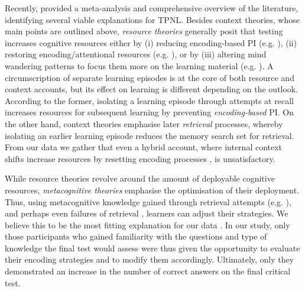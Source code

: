 \documentclass[../main.tex]{subfiles}
\begin{document}
Recently, \cite{chanRetrievalPotentiatesNew2018} provided a meta-analysis 
and comprehensive overview of the literature, identifying several 
viable explanations for TPNL. Besides context theories, whose main points 
are outlined above, \textit{resource theories} generally posit that testing 
increases cognitive resources either by (i) reducing encoding-based PI (e.g. 
\citealp{wahlheimTestingCanCounteract2015, 
	weinsteinTestingProtectsProactive2011, 
	szpunarTestingStudyInsulates2008}), (ii) restoring 
	encoding/attentional 
resources (e.g. \citealp{pastotterRetrievalLearningFacilitates2011}), or by 
(iii) altering mind wandering patterns to focus them more on the learning 
material (e.g. \citealp{jingInterpolatedTestingInfluences2016, 
	szpunarInterpolatedMemoryTests2013,szpunarMindWanderingEducation2013}).
A circumscription of separate learning episodes is at the core of both 
resource and context accounts, but its effect on learning is different 
depending on the outlook. According to the former, isolating a learning 
episode through attempts at recall increases resources for subsequent 
learning by preventing \textit{encoding-based} PI. On the other hand, 
context theories emphasise later \textit{retrieval} processes, whereby 
isolating an earlier learning episode reduces the memory search set for 
retrieval. From our data we gather that even a hybrid account, where 
internal context shifts increase resources by resetting encoding processes 
\citep{pastotterRetrievalLearningFacilitates2011}, is 
unsatisfactory.

While resource theories revolve around the amount of deployable cognitive 
resources, \textit{metacognitive theories} emphasise the optimisation of 
their deployment. Thus, using metacognitive 
knowledge gained through retrieval attempts (e.g. 
\citealp{choTestingEnhancesBoth2017, 
	chanTestingPotentiatesNew2018}), and perhaps even failures of retrieval 
\citep{bahrickImportanceRetrievalFailures2005}, learners can adjust their 
strategies. We believe this to be the most fitting explanation for our data 
\citep{wissmanInterimTestEffect2011, 
	chanTestingPotentiatesNew2018}. In our study, only those participants
who gained familiarity with the questions and type of knowledge the final 
test would assess were thus given the opportunity to evaluate their encoding 
strategies and to modify them accordingly. Ultimately, only they 
demonstrated an increase in the number of correct answers on the final 
critical test. 
\end{document}
